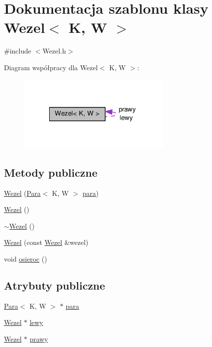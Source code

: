 \hypertarget{class_wezel}{\section{\-Dokumentacja szablonu klasy \-Wezel$<$ \-K, \-W $>$}
\label{class_wezel}
}


{\ttfamily \#include $<$\-Wezel.\-h$>$}



\-Diagram współpracy dla \-Wezel$<$ \-K, \-W $>$\-:\nopagebreak
\begin{figure}[H]
\begin{center}
\leavevmode
\includegraphics[width=212pt]{class_wezel__coll__graph}
\end{center}
\end{figure}
\subsection*{\-Metody publiczne}
\begin{DoxyCompactItemize}
\item 
\hyperlink{class_wezel_a53d3ba4254af71bdf944878ce0f69552}{\-Wezel} (\hyperlink{class_para}{\-Para}$<$ \-K, \-W $>$ \hyperlink{class_wezel_a4ce56c464874565cc027ce9660cf8e25}{para})
\item 
\hyperlink{class_wezel_a0cd481c65e68ade2fd5a1f142c6995a5}{\-Wezel} ()
\item 
\hyperlink{class_wezel_a55c98fea43ceb7c06e2317754df6626a}{$\sim$\-Wezel} ()
\item 
\hyperlink{class_wezel_a32218370d2423ff2e42f65926c74c767}{\-Wezel} (const \hyperlink{class_wezel}{\-Wezel} \&wezel)
\item 
void \hyperlink{class_wezel_acfc2260875484193f734f2eeed617062}{osieroc} ()
\end{DoxyCompactItemize}
\subsection*{\-Atrybuty publiczne}
\begin{DoxyCompactItemize}
\item 
\hyperlink{class_para}{\-Para}$<$ \-K, \-W $>$ $\ast$ \hyperlink{class_wezel_a4ce56c464874565cc027ce9660cf8e25}{para}
\item 
\hyperlink{class_wezel}{\-Wezel} $\ast$ \hyperlink{class_wezel_ae58a8e38a89e571a26afa5e2ca93a1f5}{lewy}
\item 
\hyperlink{class_wezel}{\-Wezel} $\ast$ \hyperlink{class_wezel_a5b54943e3c95535fbf59be020808e359}{prawy}
\end{DoxyCompactItemize}


